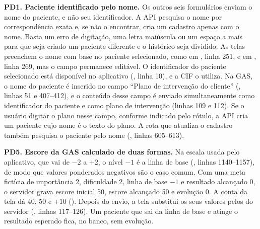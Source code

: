\textbf{PD1. Paciente identificado pelo nome.} Os outros seis formulários enviam o nome do paciente, e não seu
identificador. A API pesquisa o nome por correspondência exata e, se não o encontrar, cria um cadastro apenas com o
nome. Basta um erro de digitação, uma letra maiúscula ou um espaço a mais para que seja criado um paciente diferente
e o histórico seja dividido. As telas preenchem o nome com base no paciente selecionado, como em ,
linha 251, e em , linha 269, mas o campo permanece editável. O identificador do paciente
selecionado está disponível no aplicativo (, linha 10), e a CIF o utiliza. Na GAS, o nome
do paciente é inserido no campo ``Plano de intervenção do cliente'' (, linhas 51 e 407--412), e o
conteúdo desse campo é enviado simultaneamente como identificador do paciente e como plano de intervenção (linhas 109
e 112). Se o usuário digitar o plano nesse campo, conforme indicado pelo rótulo, a API cria um paciente cujo nome é o
texto do plano. A rota que atualiza o cadastro também pesquisa o paciente pelo nome (, linhas
605--613).

\textbf{PD5. Escore da GAS calculado de duas formas.} Na escala usada pelo aplicativo, que vai de $-2$ a $+2$, o
nível $-1$ é a linha de base (, linhas 1140--1157), de modo que valores ponderados negativos são o
caso comum. Com uma meta fictícia de importância 2, dificuldade 2, linha de base $-1$ e resultado alcançado 0, o
servidor grava escore inicial 50, escore alcançado 50 e evolução 0. A conta da tela dá 40, 50 e $+10$
(). Depois do envio, a tela substitui os seus valores pelos do servidor
(, linhas 117--126). Um paciente que sai da linha de base e atinge o resultado esperado fica, no
banco, sem evolução.

